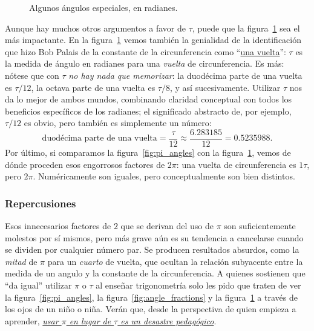 \begin{figure}
\begin{center}
\end{center}
\caption{Algunos ángulos especiales, en radianes.\label{fig:tau_angles}}
\end{figure}

Aunque hay muchos otros argumentos a favor de $\tau$, puede que la figura~\ref{fig:tau_angles} sea el más impactante. En la figura~\ref{fig:tau_angles} vemos también la genialidad de la identificación que hizo Bob Palais de la constante de la circunferencia como ``\href{https://en.wikipedia.org/wiki/Turn_(geometry)}{una vuelta}'': $\tau$ es la medida de ángulo en radianes para una \emph{vuelta} de circunferencia. Es más: nótese que con $\tau$ \emph{no hay nada que memorizar}: la duodécima parte de una vuelta es $\tau/12$, la octava parte de una vuelta es $\tau/8$, y así sucesivamente. Utilizar $\tau$ nos da lo mejor de ambos mundos, combinando claridad conceptual con todos los beneficios específicos de los radianes; el significado abstracto de, por ejemplo, $\tau/12$ es obvio, pero también es simplemente un número:
\[
  \mbox{duodécima parte de una vuelta} = \frac{\tau}{12} \approx \frac{6.283185}{12} = 0.5235988.
\]
Por último, si comparamos la figura~\ref{fig:pi_angles} con la figura~\ref{fig:tau_angles}, vemos de dónde proceden esos engorrosos factores de $2\pi$: una vuelta de circunferencia es $1\tau$, pero $2\pi$. Numéricamente son iguales, pero conceptualmente son bien distintos.

    \subsubsection{Repercusiones} %
    \label{sec:the_ramifications}

Esos innecesarios factores de $2$ que se derivan del uso de $\pi$ son suficientemente molestos por sí mismos, pero más grave aún es su tendencia a cancelarse cuando se dividen por cualquier número par. Se producen resultados absurdos, como la  \emph{mitad} de $\pi$ para un \emph{cuarto} de vuelta, que ocultan la relación subyacente entre la medida de un angulo y la constante de la circunferencia. A quienes sostienen que ``da igual'' utilizar $\pi$ o $\tau$ al enseñar trigonometría solo les pido que traten de ver la figura~\ref{fig:pi_angles}, la figura~\ref{fig:angle_fractions} y la figura~\ref{fig:tau_angles} a través de los ojos de un niño o niña. Verán que, desde la perspectiva de quien empieza a aprender, \href{http://tauday.com/a-tau-testimonial}{\emph{usar $\pi$ en lugar de $\tau$ es un desastre pedagógico}}.

